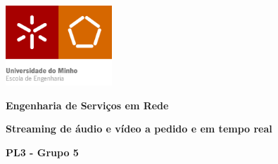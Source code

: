 \documentclass[a4paper, 11pt]{article}
\begin{document}
\begin{titlepage}
    \begin{center}

    	\includegraphics[width=0.3\textwidth]{images/Capa/EEUMfinal .png}
       
       \vspace*{1cm}
       
       \textbf{\Large Engenharia de Serviços em Rede}
        \vspace{1cm}
        \par
        \textbf{\Large Streaming de áudio e vídeo a pedido e em tempo real }
        \vspace{1cm}
        \par
        \Large \textbf{PL3 - Grupo 5}
        

\end{center}
\end{titlepage}
\end{document}
